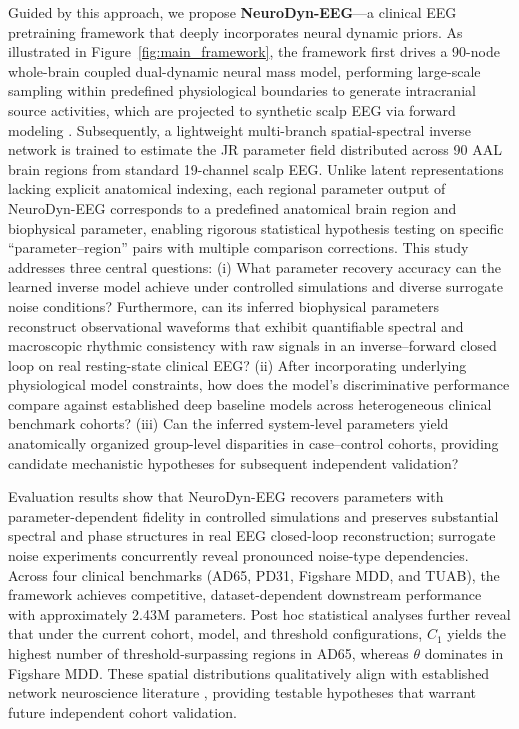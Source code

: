 \documentclass{article}
\begin{document}
Guided by this approach, we propose \textbf{NeuroDyn-EEG}---a clinical EEG pretraining framework that deeply incorporates neural dynamic priors. 
As illustrated in Figure~\ref{fig:main_framework}, the framework first drives a 90-node whole-brain coupled dual-dynamic neural mass model, performing large-scale sampling within predefined physiological boundaries to generate intracranial source activities, which are projected to synthetic scalp EEG via forward modeling \citep{grech2008review,michel2019eegsource}. Subsequently, a lightweight multi-branch spatial-spectral inverse network is trained to estimate the JR parameter field distributed across 90 AAL brain regions \citep{tzourio2002automated} from standard 19-channel scalp EEG. Unlike latent representations lacking explicit anatomical indexing, each regional parameter output of NeuroDyn-EEG corresponds to a predefined anatomical brain region and biophysical parameter, enabling rigorous statistical hypothesis testing on specific ``parameter--region'' pairs with multiple comparison corrections. This study addresses three central questions:
(i) What parameter recovery accuracy can the learned inverse model achieve under controlled simulations and diverse surrogate noise conditions? Furthermore, can its inferred biophysical parameters reconstruct observational waveforms that exhibit quantifiable spectral and macroscopic rhythmic consistency with raw signals in an inverse--forward closed loop on real resting-state clinical EEG?
(ii) After incorporating underlying physiological model constraints, how does the model's discriminative performance compare against established deep baseline models across heterogeneous clinical benchmark cohorts?
(iii) Can the inferred system-level parameters yield anatomically organized group-level disparities in case--control cohorts, providing candidate mechanistic hypotheses for subsequent independent validation?

Evaluation results show that NeuroDyn-EEG recovers parameters with parameter-dependent fidelity in controlled simulations and preserves substantial spectral and phase structures in real EEG closed-loop reconstruction; surrogate noise experiments concurrently reveal pronounced noise-type dependencies. Across four clinical benchmarks (AD65, PD31, Figshare MDD, and TUAB), the framework achieves competitive, dataset-dependent downstream performance with approximately 2.43M parameters. Post hoc statistical analyses further reveal that under the current cohort, model, and threshold configurations, \texttt{$C_1$} yields the highest number of threshold-surpassing regions in AD65, whereas \texttt{$\theta$} dominates in Figshare MDD. These spatial distributions qualitatively align with established network neuroscience literature \citep{jeong2004eeg,stam2005eeg,palop2016network,kaiser2015large,mulders2015resting,sanacora1999reduced}, providing testable hypotheses that warrant future independent cohort validation.
\end{document}
